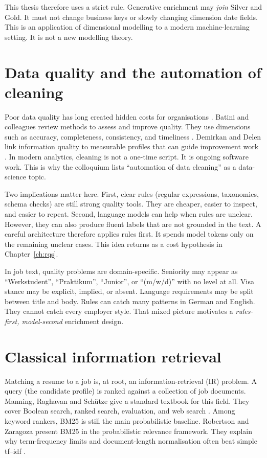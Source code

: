 This thesis therefore uses a strict rule. Generative enrichment may \emph{join} Silver and Gold. It must not change business keys or slowly changing dimension date fields. This is an application of dimensional modelling to a modern machine-learning setting. It is not a new modelling theory.

\section{Data quality and the automation of cleaning}
\label{sec:quality}

Poor data quality has long created hidden costs for organisations . Batini and colleagues review methods to assess and improve quality. They use dimensions such as accuracy, completeness, consistency, and timeliness . Demirkan and Delen link information quality to measurable profiles that can guide improvement work . In modern analytics, cleaning is not a one-time script. It is ongoing software work. This is why the colloquium lists ``automation of data cleaning'' as a data-science topic.

Two implications matter here. First, clear rules (regular expressions, taxonomies, schema checks) are still strong quality tools. They are cheaper, easier to inspect, and easier to repeat. Second, language models can help when rules are unclear. However, they can also produce fluent labels that are not grounded in the text. A careful architecture therefore applies rules first. It spends model tokens only on the remaining unclear cases. This idea returns as a cost hypothesis in Chapter~\ref{ch:rqs}.

In job text, quality problems are domain-specific. Seniority may appear as ``Werkstudent'', ``Praktikum'', ``Junior'', or ``(m/w/d)'' with no level at all. Visa stance may be explicit, implied, or absent. Language requirements may be split between title and body. Rules can catch many patterns in German and English. They cannot catch every employer style. That mixed picture motivates a \emph{rules-first, model-second} enrichment design.

\section{Classical information retrieval}
\label{sec:classical-ir}

Matching a resume to a job is, at root, an information-retrieval (IR) problem. A query (the candidate profile) is ranked against a collection of job documents. Manning, Raghavan and Sch\"utze give a standard textbook for this field. They cover Boolean search, ranked search, evaluation, and web search . Among keyword rankers, BM25 is still the main probabilistic baseline. Robertson and Zaragoza present BM25 in the probabilistic relevance framework. They explain why term-frequency limits and document-length normalisation often beat simple tf--idf .

